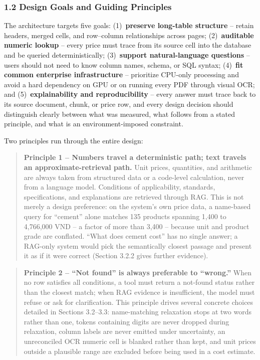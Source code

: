 \documentclass[11pt,a4paper]{article}
\begin{document}
\subsubsection{1.2 Design Goals and Guiding Principles}

The architecture targets five goals: (1)~\textbf{preserve long-table
structure} -- retain headers, merged cells, and row--column relationships
across pages; (2)~\textbf{auditable numeric lookup} -- every price must trace
from its source cell into the database and be queried deterministically;
(3)~\textbf{support natural-language questions} -- users should not need to
know column names, schema, or SQL syntax; (4)~\textbf{fit common enterprise
infrastructure} -- prioritize CPU-only processing and avoid a hard
dependency on GPU or on running every PDF through visual OCR; and
(5)~\textbf{explainability and reproducibility} -- every answer must trace
back to its source document, chunk, or price row, and every design decision
should distinguish clearly between what was measured, what follows from a
stated principle, and what is an environment-imposed constraint.

Two principles run through the entire design:

\begin{quote}
\textbf{Principle 1 -- Numbers travel a deterministic path; text travels an
approximate-retrieval path.} Unit prices, quantities, and arithmetic are
always taken from structured data or a code-level calculation, never from a
language model. Conditions of applicability, standards, specifications, and
explanations are retrieved through RAG. This is not merely a design
preference: on the system's own price data, a name-based query for
``cement'' alone matches 135 products spanning 1,400 to 4,766,000 VND -- a
factor of more than 3,400 -- because unit and product grade are conflated.
``What does cement cost'' has no single answer; a RAG-only system would pick
the semantically closest passage and present it as if it were correct
(Section 3.2.2 gives further evidence).
\end{quote}

\begin{quote}
\textbf{Principle 2 -- ``Not found'' is always preferable to ``wrong.''}
When no row satisfies all conditions, a tool must return a not-found status
rather than the closest match; when RAG evidence is insufficient, the model
must refuse or ask for clarification. This principle drives several concrete
choices detailed in Sections 3.2--3.3: name-matching relaxation stops at two
words rather than one, tokens containing digits are never dropped during
relaxation, column labels are never emitted under uncertainty, an
unreconciled OCR numeric cell is blanked rather than kept, and unit prices
outside a plausible range are excluded before being used in a cost estimate.
\end{quote}
\end{document}
